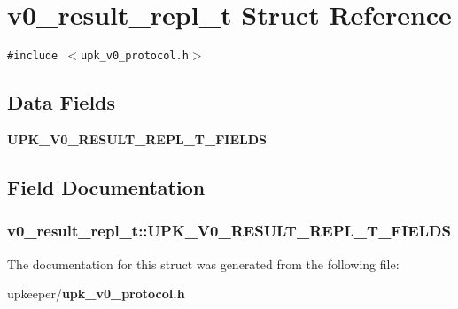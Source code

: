 \section{v0\_\-result\_\-repl\_\-t Struct Reference}
\label{structv0__result__repl__t}
{\tt \#include $<$upk\_\-v0\_\-protocol.h$>$}

\subsection*{Data Fields}
\begin{CompactItemize}
\item 
\bf{UPK\_\-V0\_\-RESULT\_\-REPL\_\-T\_\-FIELDS}
\end{CompactItemize}


\subsection{Field Documentation}
\subsubsection{\setlength{\rightskip}{0pt plus 5cm}\bf{v0\_\-result\_\-repl\_\-t::UPK\_\-V0\_\-RESULT\_\-REPL\_\-T\_\-FIELDS}}\label{structv0__result__repl__t_45f249b0461e6c17d871f5c2d5e009cc}




The documentation for this struct was generated from the following file:\begin{CompactItemize}
\item 
upkeeper/\bf{upk\_\-v0\_\-protocol.h}\end{CompactItemize}
